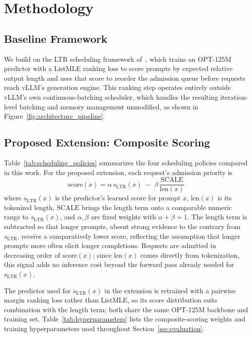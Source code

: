 \section{Methodology}
\label{sec:methodology}

\subsection{Baseline Framework}

We build on the LTR scheduling framework of~\cite{fu2024efficient}, which
trains an OPT-125M predictor with a ListMLE ranking loss to score prompts by
expected relative output length and uses that score to reorder the admission
queue before requests reach vLLM's generation engine. This ranking step
operates entirely outside vLLM's own continuous-batching scheduler, which
handles the resulting iteration-level batching and memory management
unmodified, as shown in Figure~\ref{fig:architecture_pipeline}.

\subsection{Proposed Extension: Composite Scoring}

Table~\ref{tab:scheduling_policies} summarizes the four scheduling policies
compared in this work. For the proposed extension, each request's admission
priority is
\begin{equation}
    \mathrm{score}(x) = \alpha \, s_{\mathrm{LTR}}(x) \;-\; \beta \, \frac{\mathrm{SCALE}}{\mathrm{len}(x)}
    \label{eq:composite-score}
\end{equation}
where $s_{\mathrm{LTR}}(x)$ is the predictor's learned score for prompt $x$,
$\mathrm{len}(x)$ is its tokenized length, $\mathrm{SCALE}$ brings the length
term onto a comparable numeric range to $s_{\mathrm{LTR}}(x)$, and
$\alpha,\beta$ are fixed weights with $\alpha+\beta=1$. The length term is
subtracted so that longer prompts, absent strong evidence to the contrary
from $s_{\mathrm{LTR}}$, receive a comparatively lower score, reflecting the
assumption that longer prompts more often elicit longer completions.
Requests are admitted in decreasing order of $\mathrm{score}(x)$; since
$\mathrm{len}(x)$ comes directly from tokenization, this signal adds no
inference cost beyond the forward pass already needed for $s_{\mathrm{LTR}}(x)$.

The predictor used for $s_{\mathrm{LTR}}(x)$ in the extension is retrained
with a pairwise margin ranking loss rather than ListMLE, so its score
distribution suits combination with the length term; both share the same
OPT-125M backbone and training set. Table~\ref{tab:hyperparameters} lists the
composite-scoring weights and training hyperparameters used throughout
Section~\ref{sec:evaluation}.

